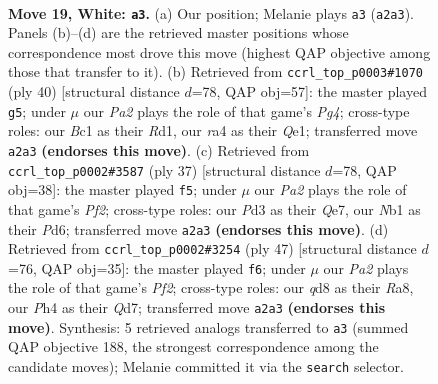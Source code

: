\documentclass[11pt]{article}
\begin{document}
\clearpage

\begin{figure}[p]\centering
\begin{subfigure}{0.46\textwidth}\centering
\resizebox{\linewidth}{!}{%
\newchessgame
\chessboard[
  setfen={1n1q1rk1/4bp2/5np1/2p4p/rp1p3P/3P2PN/P3PPK1/RNB1QR2 w - - 0 19},
  showmover=false,
  pgfstyle=straightmove, color=movearrow, markmove={a2-a3}
]}
\caption{}
\end{subfigure}\hfill
\begin{subfigure}{0.46\textwidth}\centering
\resizebox{\linewidth}{!}{%
\newchessgame
\chessboard[
  setfen={5rk1/2r1bpp1/pq1p1n1p/1p1Pp3/6PP/1N3P2/PPP4R/1K1RQB2 w - - 3 21},
  showmover=false,
  pgfstyle=straightmove, color=movearrow, markmove={g4-g5}
]}
\caption{}
\end{subfigure}
\\[4pt]
\begin{subfigure}{0.46\textwidth}\centering
\resizebox{\linewidth}{!}{%
\newchessgame
\chessboard[
  setfen={1rb2rk1/4qppp/2ppn3/p1p5/2P1P3/P2PB2P/1P1N1RP1/1R1Q2K1 b - - 4 19},
  showmover=false,
  pgfstyle=straightmove, color=movearrow, markmove={f7-f5}
]}
\caption{}
\end{subfigure}\hfill
\begin{subfigure}{0.46\textwidth}\centering
\resizebox{\linewidth}{!}{%
\newchessgame
\chessboard[
  setfen={r4r1k/2pqnppp/1p1p4/p7/b1PPPR1P/2PBNQP1/5R2/6K1 b - - 1 24},
  showmover=false,
  pgfstyle=straightmove, color=movearrow, markmove={f7-f6}
]}
\caption{}
\end{subfigure}
\caption{\textbf{Move 19, White: \texttt{a3}.} (a) Our position; Melanie plays \texttt{a3} (\texttt{a2a3}). Panels (b)--(d) are the retrieved master positions whose correspondence most drove this move (highest QAP objective among those that transfer to it). (b) Retrieved from \texttt{ccrl\_top\_p0003\#1070} (ply 40) [structural distance $d$=78, QAP obj=57]: the master played \texttt{g5}; under $\mu$ our \emph{Pa2} plays the role of that game's \emph{Pg4}; cross-type roles: our \emph{B}c1 as their \emph{R}d1, our \emph{r}a4 as their \emph{Q}e1; transferred move \texttt{a2a3} \textbf{(endorses this move)}. (c) Retrieved from \texttt{ccrl\_top\_p0002\#3587} (ply 37) [structural distance $d$=78, QAP obj=38]: the master played \texttt{f5}; under $\mu$ our \emph{Pa2} plays the role of that game's \emph{Pf2}; cross-type roles: our \emph{P}d3 as their \emph{Q}e7, our \emph{N}b1 as their \emph{P}d6; transferred move \texttt{a2a3} \textbf{(endorses this move)}. (d) Retrieved from \texttt{ccrl\_top\_p0002\#3254} (ply 47) [structural distance $d$=76, QAP obj=35]: the master played \texttt{f6}; under $\mu$ our \emph{Pa2} plays the role of that game's \emph{Pf2}; cross-type roles: our \emph{q}d8 as their \emph{R}a8, our \emph{P}h4 as their \emph{Q}d7; transferred move \texttt{a2a3} \textbf{(endorses this move)}. Synthesis: 5 retrieved analogs transferred to \texttt{a3} (summed QAP objective 188, the strongest correspondence among the candidate moves); Melanie committed it via the \texttt{search} selector.}
\label{fig:thought-m36}
\end{figure}
\end{document}
